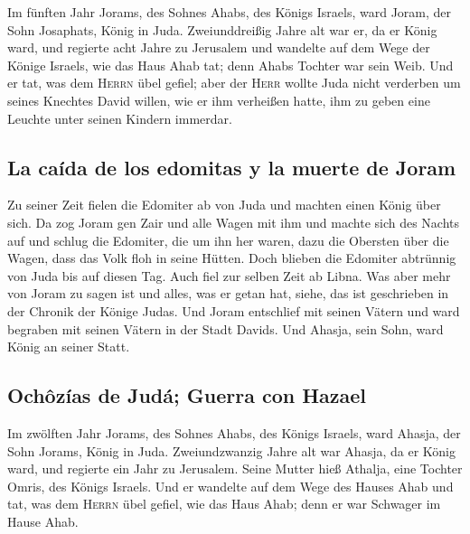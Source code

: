  Im fünften Jahr Jorams, des Sohnes Ahabs, des Königs
Israels, ward Joram, der Sohn Josaphats, König in Juda. 
Zweiunddreißig Jahre alt war er, da er König ward, und regierte acht
Jahre zu Jerusalem  und wandelte auf dem Wege der Könige
Israels, wie das Haus Ahab tat; denn Ahabs Tochter war sein Weib. Und er
tat, was dem \textsc{Herrn} übel gefiel;  aber der
\textsc{Herr} wollte Juda nicht verderben um seines Knechtes David
willen, wie er ihm verheißen hatte, ihm zu geben eine Leuchte unter
seinen Kindern immerdar.

\hypertarget{la-cauxedda-de-los-edomitas-y-la-muerte-de-joram}{%
\subsection{La caída de los edomitas y la muerte de
Joram}\label{la-cauxedda-de-los-edomitas-y-la-muerte-de-joram}}

 Zu seiner Zeit fielen die Edomiter ab von Juda und
machten einen König über sich.  Da zog Joram gen Zair und
alle Wagen mit ihm und machte sich des Nachts auf und schlug die
Edomiter, die um ihn her waren, dazu die Obersten über die Wagen, dass
das Volk floh in seine Hütten.  Doch blieben die Edomiter
abtrünnig von Juda bis auf diesen Tag. Auch fiel zur selben Zeit ab
Libna.  Was aber mehr von Joram zu sagen ist und alles,
was er getan hat, siehe, das ist geschrieben in der Chronik der Könige
Judas.  Und Joram entschlief mit seinen Vätern und ward
begraben mit seinen Vätern in der Stadt Davids. Und Ahasja, sein Sohn,
ward König an seiner Statt.

\hypertarget{ochuxf4zuxedas-de-juduxe1-guerra-con-hazael}{%
\subsection{Ochôzías de Judá; Guerra con
Hazael}\label{ochuxf4zuxedas-de-juduxe1-guerra-con-hazael}}

 Im zwölften Jahr Jorams, des Sohnes Ahabs, des Königs
Israels, ward Ahasja, der Sohn Jorams, König in Juda. 
Zweiundzwanzig Jahre alt war Ahasja, da er König ward, und regierte ein
Jahr zu Jerusalem. Seine Mutter hieß Athalja, eine Tochter Omris, des
Königs Israels.  Und er wandelte auf dem Wege des Hauses
Ahab und tat, was dem \textsc{Herrn} übel gefiel, wie das Haus Ahab;
denn er war Schwager im Hause Ahab.

